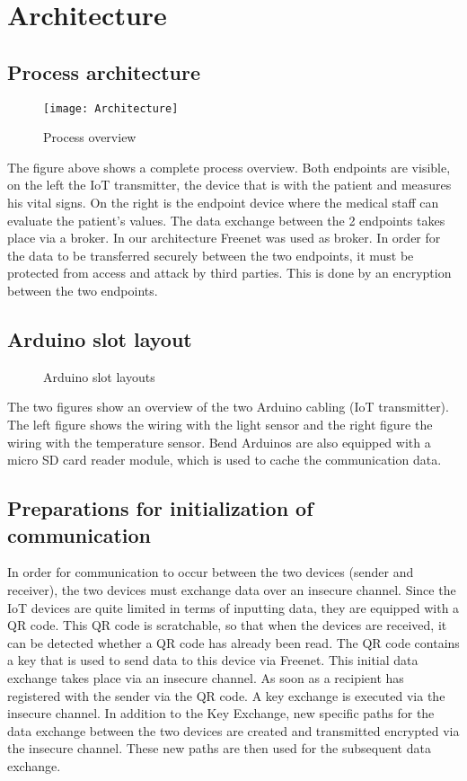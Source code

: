 \chapter{Architecture}
\section{Process architecture}
\begin{figure}[!htb]
    \centering
    \texttt{[image: Architecture]}
    \caption[Process overview]{Process overview}
    \label{fig:Architecture}
\end{figure}
\noindent
The figure above shows a complete process overview. Both endpoints are visible, on the left the IoT transmitter, the device that is with the patient and measures his vital signs. On the right is the endpoint device where the medical staff can evaluate the patient's values. The data exchange between the 2 endpoints takes place via a broker. In our architecture Freenet was used as broker. In order for the data to be transferred securely between the two endpoints, it must be protected from access and attack by third parties. This is done by an encryption between the two endpoints.
\newpage
\section{Arduino slot layout}
\begin{center}
\begin{figure}[!htb]
\hfill
{}
\caption{Arduino slot layouts}
\end{figure}
\end{center}
The two figures show an overview of the two Arduino cabling (IoT transmitter). The left figure shows the wiring with the light sensor and the right figure the wiring with the temperature sensor.
Bend Arduinos are also equipped with a micro SD card reader module, which is used to cache the communication data.
\newpage
\section{Preparations for initialization of communication}
In order for communication to occur between the two devices (sender and receiver), the two devices must exchange data over an insecure channel. Since the IoT devices are quite limited in terms of inputting data, they are equipped with a QR code. This QR code is scratchable, so that when the devices are received, it can be detected whether a QR code has already been read. The QR code contains a key that is used to send data to this device via Freenet. 
This initial data exchange takes place via an insecure channel. As soon as a recipient has registered with the sender via the QR code. A key exchange is executed via the insecure channel. In addition to the Key Exchange, new specific paths for the data exchange between the two devices are created and transmitted encrypted via the insecure channel. These new paths are then used for the subsequent data exchange.
\newpage